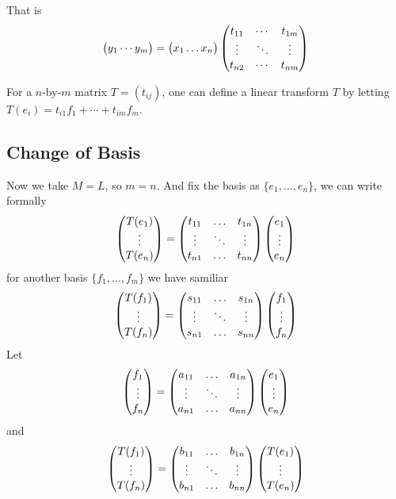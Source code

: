 That is
$$
\left(\begin{matrix}
y_1 \cdots y_m
\end{matrix}\right)
=
\left(\begin{matrix}
x_1 \dots x_n
\end{matrix}\right)
\left(\begin{matrix}
t_{11} & \cdots & t_{1m}	\cr
\vdots & \ddots & \vdots \cr
t_{n2} & \cdots & t_{nm}
\end{matrix}\right)
$$

For a $n$-by-$m$ matrix $T = (t_{ij})$, one can define a linear transform $T$
by letting $T(e_i) = t_{i1} f_1 + \cdots + t_{im}f_m$.


\subsection{Change of Basis}
Now we take $M = L$, so $m = n$. And fix the basis as $\{e_1, \dots, e_n\}$,
we can write formally
$$
\left(\begin{matrix}
T(e_1) \cr \vdots \cr T(e_n)
\end{matrix}\right)
=
\left(\begin{matrix}
t_{11} & \hdots & t_{1n} \cr
\vdots & \ddots & \vdots \cr
t_{n1} & \hdots & t_{nn}
\end{matrix}\right)
\left(\begin{matrix}
e_1 \cr \vdots \cr e_n
\end{matrix}\right)
$$
for another basis $\{f_1, \dots, f_m\}$ we have samiliar
$$
\left(\begin{matrix}
T(f_1) \cr \vdots \cr T(f_n)
\end{matrix}\right)
=
\left(\begin{matrix}
s_{11} & \hdots & s_{1n} \cr
\vdots & \ddots & \vdots \cr
s_{n1} & \hdots & s_{nn}
\end{matrix}\right)
\left(\begin{matrix}
f_1 \cr \vdots \cr f_n
\end{matrix}\right)
$$
Let
$$
\left(\begin{matrix}
f_1 \cr \vdots \cr f_n
\end{matrix}\right)
=
\left(\begin{matrix}
a_{11} & \hdots & a_{1n} \cr
\vdots & \ddots & \vdots \cr
a_{n1} & \hdots & a_{nn}
\end{matrix}\right)
\left(\begin{matrix}
e_1 \cr \vdots \cr e_n
\end{matrix}\right)
$$
and
$$
\left(\begin{matrix}
T(f_1) \cr \vdots \cr T(f_n)
\end{matrix}\right)
=
\left(\begin{matrix}
b_{11} & \hdots & b_{1n} \cr
\vdots & \ddots & \vdots \cr
b_{n1} & \hdots & b_{nn}
\end{matrix}\right)
\left(\begin{matrix}
T(e_1) \cr \vdots \cr T(e_n)
\end{matrix}\right)
$$
